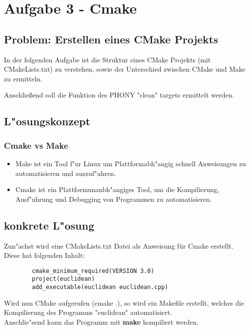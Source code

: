 \documentclass[a4paper,11pt,titlepage]{article}
\begin{document}
    \section{Aufgabe 3 - Cmake}

    \subsection{Problem: Erstellen eines CMake Projekts}
    In der folgenden Aufgabe ist die Struktur eines CMake Projekts (mit CMakeLists.txt) zu verstehen, sowie der Unterschied zwischen CMake und Make zu ermitteln.

    Anschließend soll die Funktion des PHONY "clean" targets ermittelt werden.

    \subsection{L"osungskonzept}

    \subsubsection{Cmake vs Make}
    \begin{itemize}
        \item Make ist ein Tool f"ur Linux um Plattformabh"angig schnell Anweisungen zu automatisieren und auszuf"uhren.
        \item Cmake ist ein Plattformunanbh"angiges Tool, um die Kompilierung, Ausf"uhrung und Debugging von Programmen zu automatisieren.
    \end{itemize}

    \subsection{konkrete L"osung}
    Zun"achst wird eine CMakeLists.txt Datei als Anweisung für Cmake erstellt. Diese hat folgenden Inhalt:
    \begin{lstlisting}
        cmake_minimum_required(VERSION 3.0)
        project(euclidean)
        add_executable(euclidean euclidean.cpp)
    \end{lstlisting}

    Wird nun CMake aufgerufen (cmake .), so wird ein Makefile erstellt, welches die Kompilierung des Programms "euclidean" automatisiert. \\
    Anschlie"send kann das Programm mit \textbf{make} kompiliert werden. \\
\end{document}
